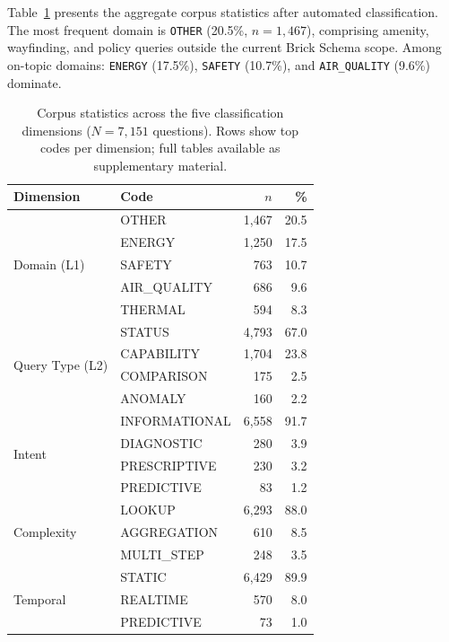 \documentclass[acmsmall]{acmart}
\begin{document}
Table~\ref{tab:corpus-stats} presents the aggregate corpus statistics after automated classification. The most frequent domain is \texttt{OTHER} (20.5\%, $n=1{,}467$), comprising amenity, wayfinding, and policy queries outside the current Brick Schema scope. Among on-topic domains: \texttt{ENERGY} (17.5\%), \texttt{SAFETY} (10.7\%), and \texttt{AIR\_QUALITY} (9.6\%) dominate.

\begin{table}[t]
\centering
\caption{Corpus statistics across the five classification dimensions ($N=7{,}151$ questions). Rows show top codes per dimension; full tables available as supplementary material.}
\label{tab:corpus-stats}
\small
\begin{tabular}{@{}llrr@{}}
\toprule
\textbf{Dimension} & \textbf{Code} & \textbf{$n$} & \textbf{\%} \\
\midrule
\multirow{5}{*}{Domain (L1)}
 & OTHER         & 1{,}467 & 20.5 \\
 & ENERGY        & 1{,}250 & 17.5 \\
 & SAFETY        &    763  & 10.7 \\
 & AIR\_QUALITY  &    686  &  9.6 \\
 & THERMAL       &    594  &  8.3 \\
\midrule
\multirow{4}{*}{Query Type (L2)}
 & STATUS        & 4{,}793 & 67.0 \\
 & CAPABILITY    & 1{,}704 & 23.8 \\
 & COMPARISON    &    175  &  2.5 \\
 & ANOMALY       &    160  &  2.2 \\
\midrule
\multirow{4}{*}{Intent}
 & INFORMATIONAL & 6{,}558 & 91.7 \\
 & DIAGNOSTIC    &    280  &  3.9 \\
 & PRESCRIPTIVE  &    230  &  3.2 \\
 & PREDICTIVE    &     83  &  1.2 \\
\midrule
\multirow{3}{*}{Complexity}
 & LOOKUP        & 6{,}293 & 88.0 \\
 & AGGREGATION   &    610  &  8.5 \\
 & MULTI\_STEP   &    248  &  3.5 \\
\midrule
\multirow{3}{*}{Temporal}
 & STATIC        & 6{,}429 & 89.9 \\
 & REALTIME      &    570  &  8.0 \\
 & PREDICTIVE    &     73  &  1.0 \\
\bottomrule
\end{tabular}
\end{table}
\end{document}
